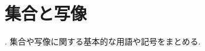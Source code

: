 \documentclass[uplatex, dvipdfmx, a4paper, 12pt, class=jsbook, crop=false]{standalone}
\begin{document}
\section{集合と写像}
\label{sec:sets-and-maps}

\WIP.
集合や写像に関する基本的な用語や記号をまとめる.
\end{document}

